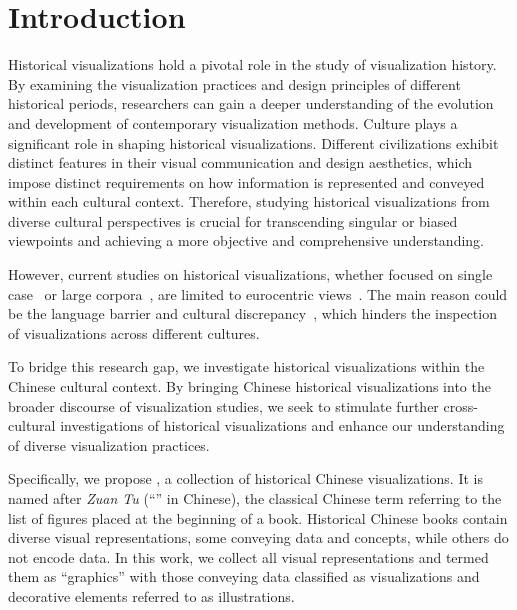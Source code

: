 \section{Introduction}
\label{sec:introduction}

Historical visualizations hold a pivotal role in the study of visualization history. 
By examining the visualization practices and design principles of different historical periods, researchers can gain a deeper understanding of the evolution and development of contemporary visualization methods.
Culture plays a significant role in shaping historical visualizations. 
Different civilizations exhibit distinct features in their visual communication and design aesthetics, which impose distinct requirements on how information is represented and conveyed within each cultural context.
Therefore, studying historical visualizations from diverse cultural perspectives is crucial for transcending singular or biased viewpoints and achieving a more objective and comprehensive understanding.

However, current studies on historical visualizations, whether focused on single case~\cite{Koch2009Crediting, Friendly2002Visions, Friendly2005Early, Wilkinson2009History, Marchese2011Exploring} or large corpora~\cite{Zhang2024OldVisOnline, Friendly2001Milestones}, are limited to eurocentric views~\cite{Gunter2021Review}.
The main reason could be the language barrier and cultural discrepancy~\cite{Friendly2021Discussion}, which hinders the inspection of visualizations across different cultures. 

To bridge this research gap, we investigate historical visualizations within the Chinese cultural context. 
By bringing Chinese historical visualizations into the broader discourse of visualization studies, we seek to stimulate further cross-cultural investigations of historical visualizations and enhance our understanding of diverse visualization practices.


Specifically, we propose \textit{\datasetName}, a collection of historical Chinese visualizations.
It is named after \textit{Zuan Tu} (``'' in Chinese), the classical Chinese term referring to the list of figures placed at the beginning of a book. 
Historical Chinese books contain diverse visual representations, some conveying data and concepts, while others do not encode data.
In this work, we collect all visual representations and termed them as ``graphics'' with those conveying data classified as visualizations and decorative elements referred to as illustrations.

